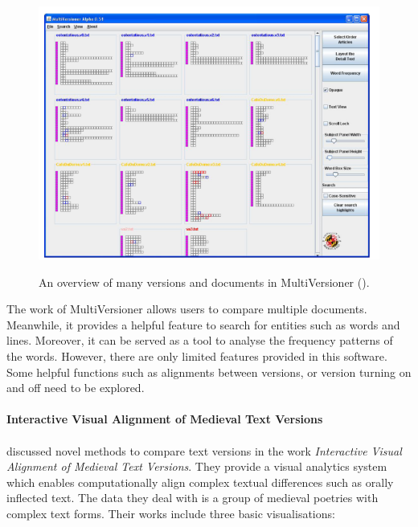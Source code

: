 \begin{figure}[H]
	\centering    
	\includegraphics[width=\textwidth]{Figs/MultiVersioner}\\[1ex]
	\caption{An overview of many versions and documents in MultiVersioner (\cite{Jong2008}).}
	\label{fig:multiVersioner}
\end{figure} 

The work of MultiVersioner allows users to compare multiple documents. Meanwhile, it provides a helpful feature to search for entities such as words and lines. Moreover, it can be served as a tool to analyse the frequency patterns of the words. However, there are only limited features provided in this software. Some helpful functions such as alignments between versions, or version turning on and off need to be explored.

\paragraph{Interactive Visual Alignment of Medieval Text Versions}
\paragraph[]{}

\cite{Stefan2017} discussed novel methods to compare text versions in the work \emph{Interactive Visual Alignment of Medieval Text Versions}. They provide a visual analytics system which enables computationally align complex textual differences such as orally inflected text. The data they deal with is a group of medieval poetries with complex text forms. Their works include three basic visualisations:

